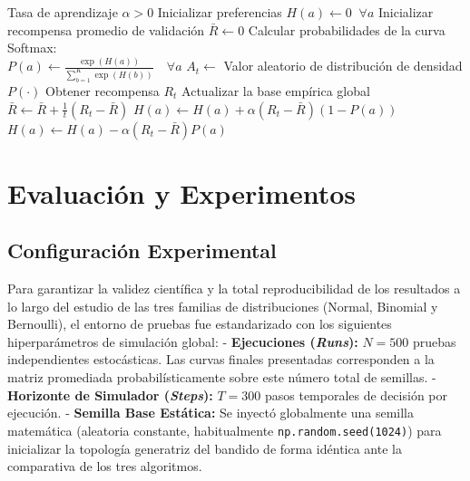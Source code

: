 \begin{algorithm}
\caption{Algoritmo de Gradiente de Preferencias}\label{algoritmo-gradiente}
\begin{algorithmic}[1]
\Require Tasa de aprendizaje $\alpha > 0$
\State Inicializar preferencias $H(a) \leftarrow 0 \;\; \forall a$ 
\State Inicializar recompensa promedio de validación $\bar{R} \leftarrow 0$
    \State Calcular probabilidades de la curva Softmax:\\
    $P(a) \leftarrow \frac{\exp(H(a))}{\sum_{b=1}^K \exp(H(b))} \quad \forall a$
    \State $A_t \leftarrow$ Valor aleatorio de distribución de densidad $P(\cdot)$
    \State Obtener recompensa $R_t$
    \State Actualizar la base empírica global $\bar{R} \leftarrow \bar{R} + \frac{1}{t}(R_t - \bar{R})$
            \State $H(a) \leftarrow H(a) + \alpha(R_t - \bar{R})(1 - P(a))$
        \Else
            \State $H(a) \leftarrow H(a) - \alpha(R_t - \bar{R})P(a)$
        \EndIf
    \EndFor
\EndFor
\end{algorithmic}
\end{algorithm}

\section{Evaluación y
Experimentos}\label{evaluacion-y-experimentos}

\subsection{Configuración
Experimental}\label{configuraciuxf3n-experimental}

Para garantizar la validez científica y la total reproducibilidad de los
resultados a lo largo del estudio de las tres familias de distribuciones
(Normal, Binomial y Bernoulli), el entorno de pruebas fue estandarizado
con los siguientes hiperparámetros de simulación global: -
\textbf{Ejecuciones (\emph{Runs}):} \(N = 500\) pruebas independientes
estocásticas. Las curvas finales presentadas corresponden a la matriz
promediada probabilísticamente sobre este número total de semillas. -
\textbf{Horizonte de Simulador (\emph{Steps}):} \(T = 300\) pasos
temporales de decisión por ejecución. - \textbf{Semilla Base Estática:}
Se inyectó globalmente una semilla matemática (aleatoria constante,
habitualmente \texttt{np.random.seed(1024)}) para inicializar la
topología generatriz del bandido de forma idéntica ante la comparativa
de los tres algoritmos.

